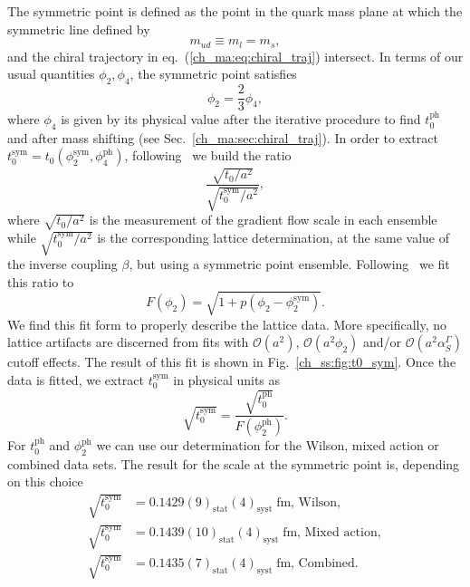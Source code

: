 The symmetric point is defined as the point in the quark mass plane at which the symmetric line defined by
\begin{equation}
m_{ud}\equiv m_l=m_s,
\end{equation}
and the chiral trajectory in eq.~(\ref{ch_ma:eq:chiral_traj}) intersect. In terms of our usual quantities $\phi_2,\phi_4$, the symmetric point satisfies
\begin{equation}
\phi_2=\frac{2}{3}\phi_4,
\end{equation}
where $\phi_4$ is given by its physical value after the iterative procedure to find $t_0^{\textrm{ph}}$ and after mass shifting (see Sec.~\ref{ch_ma:sec:chiral_traj}). In order to extract $t_0^{\textrm{sym}}=t_0(\phi_2^{\textrm{sym}},\phi_4^{\textrm{ph}})$, following~\citep{Strassberger:2023xnj} we build the ratio
\begin{equation}
\frac{\sqrt{t_0/a^2}}{\sqrt{t_0^{\textrm{sym}}/a^2}},
\end{equation}
where $\sqrt{t_0/a^2}$ is the measurement of the gradient flow scale in each ensemble while $\sqrt{t_0^{\textrm{sym}}/a^2}$ is the corresponding lattice determination, at the same value of the inverse coupling $\beta$, but using a symmetric point ensemble. Following~\citep{Strassberger:2023xnj} we fit this ratio to
\begin{equation}
\label{ch_ss:eq:fit_t0_sym}
F(\phi_2)=\sqrt{1+p(\phi_2-\phi_2^{\textrm{sym}})}.
\end{equation}
We find this fit form to properly describe the lattice data. More specifically, no lattice artifacts are discerned from fits with $\mathcal{O}(a^2)$, $\mathcal{O}(a^2\phi_2)$ and/or $\mathcal{O}(a^2\alpha_S^{\Gamma})$ cutoff effects. The result of this fit is shown in Fig.~\ref{ch_ss:fig:t0_sym}. Once the data is fitted, we extract $t_0^{\textrm{sym}}$ in physical units as
\begin{equation}
\sqrt{t_0^{\textrm{sym}}}=\frac{\sqrt{t_0^{\textrm{ph}}}}{F(\phi_2^{\textrm{ph}})}.
\end{equation}
For $t_0^{\textrm{ph}}$ and $\phi_2^{\textrm{ph}}$ we can use our determination for the Wilson, mixed action or combined data sets. The result for the scale at the symmetric point is, depending on this choice
\begin{align}
\label{ch_ss:eq:t0_sym}
\sqrt{t_0^{\textrm{sym}}}&=0.1429(9)_{\textrm{stat}}(4)_{\textrm{syst}}\;\textrm{fm, Wilson}, \\
\sqrt{t_0^{\textrm{sym}}}&=0.1439(10)_{\textrm{stat}}(4)_{\textrm{syst}}\;\textrm{fm, Mixed action}, \\
\sqrt{t_0^{\textrm{sym}}}&=0.1435(7)_{\textrm{stat}}(4)_{\textrm{syst}}\;\textrm{fm, Combined}.
\end{align}

